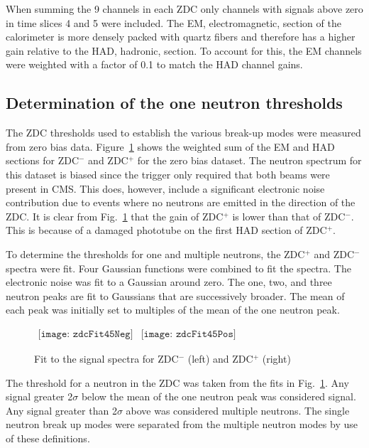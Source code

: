       When summing the 9 channels in each ZDC only channels with signals above 
        zero in time slices 4 and 5 were included. 
      The EM, electromagnetic, section of the calorimeter is more densely 
        packed with quartz fibers and therefore has a higher gain relative to 
        the HAD, hadronic, section. 
      To account for this, the EM channels were weighted with
        a factor of 0.1 to match the HAD channel gains.

    \subsection{Determination of the one neutron thresholds}
      The ZDC thresholds used to establish the various break-up modes were 
        measured from zero bias data.
      Figure~\ref{fig:zdcM2Fit} shows the weighted sum of the EM and 
        HAD sections for  ZDC$^{-}$ and  ZDC$^{+}$ for the zero bias 
        dataset.
      The neutron spectrum for this dataset \DIFdelbegin {}\DIFdelend is biased since the 
        trigger only required that both beams were present in CMS. 
      This does, however, include a significant electronic noise contribution due
        to events where no neutrons are emitted in the direction of the ZDC.
      It is clear from Fig.~\ref{fig:zdcM2Fit} that the gain of  
        ZDC$^{+}$ is lower than that of ZDC$^{-}$. 
      This is because of a damaged phototube on the first HAD section 
        of ZDC$^{+}$.

      To determine the thresholds for one and multiple neutrons, the ZDC$^{+}$ 
        and ZDC$^{-}$ spectra were fit.
      Four Gaussian functions were combined to fit the spectra. 
      The electronic noise was fit to a Gaussian around zero.
      The one, two, and three neutron peaks are fit to Gaussians that are 
        successively broader.
      The mean of each peak was initially set to multiples of the mean of the 
        one neutron peak. 
      \begin{figure}[!Hh]
        \centering
        $ 
          \begin{array}{cc}
            \texttt{[image: zdcFit45Neg]} &
            \texttt{[image: zdcFit45Pos]}
          \end{array} 
        $
        \caption{Fit to the signal spectra for ZDC$^{-}$ (left) and ZDC$^{+}$ 
          (right)}
        \label{fig:zdcM2Fit}
      \end{figure}
      The threshold for a neutron in the ZDC was taken from the fits in 
        Fig.~\ref{fig:zdcM2Fit}.
      Any signal greater 2$\sigma$ below the mean of the one neutron peak was 
        considered signal.
      Any signal greater than 2$\sigma$ above was considered multiple 
        neutrons.
      The single neutron break up modes were separated from the multiple 
        neutron modes by use of these definitions.

